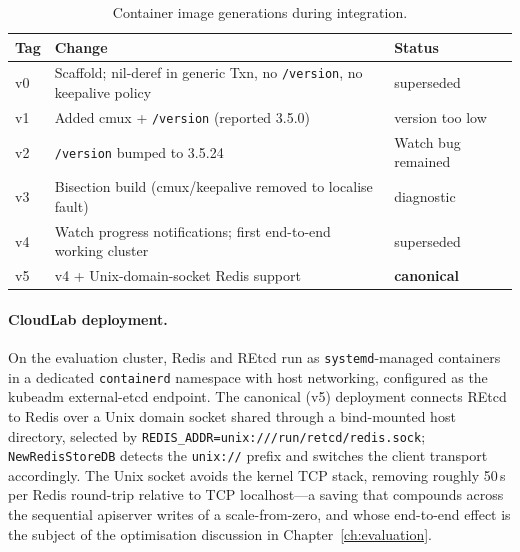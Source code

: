 \begin{table}[h]
    \centering
    \caption{Container image generations during integration.}
    \label{tab:impl-images}
    \begin{tabular}{@{}lll@{}}
        \toprule
        \textbf{Tag} & \textbf{Change} & \textbf{Status} \\
        \midrule
        v0 & Scaffold; nil-deref in generic Txn, no \texttt{/version}, no keepalive policy & superseded \\
        v1 & Added cmux + \texttt{/version} (reported 3.5.0) & version too low \\
        v2 & \texttt{/version} bumped to 3.5.24 & Watch bug remained \\
        v3 & Bisection build (cmux/keepalive removed to localise fault) & diagnostic \\
        v4 & Watch progress notifications; first end-to-end working cluster & superseded \\
        v5 & v4 + Unix-domain-socket Redis support & \textbf{canonical} \\
        \bottomrule
    \end{tabular}
\end{table}

\paragraph{CloudLab deployment.}
On the evaluation cluster, Redis and REtcd run as \texttt{systemd}-managed containers in a dedicated \texttt{containerd} namespace with host networking, configured as the kubeadm external-etcd endpoint. The canonical (v5) deployment connects REtcd to Redis over a Unix domain socket shared through a bind-mounted host directory, selected by \texttt{REDIS\_ADDR=unix:///run/retcd/redis.sock}; \texttt{NewRedisStoreDB} detects the \texttt{unix://} prefix and switches the client transport accordingly. The Unix socket avoids the kernel TCP stack, removing roughly 50\,\textmu{}s per Redis round-trip relative to TCP localhost---a saving that compounds across the sequential apiserver writes of a scale-from-zero, and whose end-to-end effect is the subject of the optimisation discussion in Chapter~\ref{ch:evaluation}.
